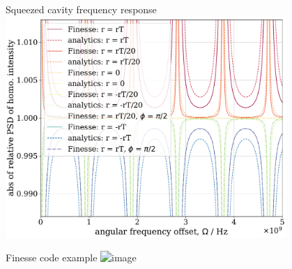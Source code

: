 \documentclass[12pt]{beamer}
\begin{document}
\begin{frame}{Squeezed cavity frequency response}
\centering
\includegraphics[width=0.8\textwidth]{figures/squeezed_cavity_relative_qhd_vs_freq_comparison.pdf}
\end{frame}

\begin{frame}{Finesse code example}
\centering 
\includegraphics<1>[height=0.85\textheight]{figures/finesse_code_example.png}
\end{frame}
\end{document}
